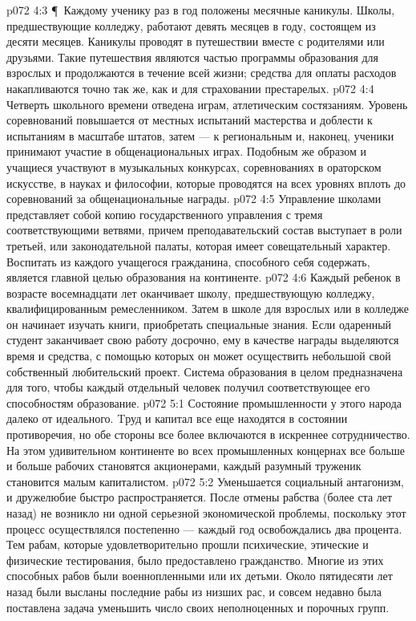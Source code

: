 \vs p072 4:3 \P\ Каждому ученику раз в год положены месячные каникулы. Школы, предшествующие колледжу, работают девять месяцев в году, состоящем из десяти месяцев. Каникулы проводят в путешествии вместе с родителями или друзьями. Такие путешествия являются частью программы образования для взрослых и продолжаются в течение всей жизни; средства для оплаты расходов накапливаются точно так же, как и для страховании престарелых.
\vs p072 4:4 Четверть школьного времени отведена играм, атлетическим состязаниям. Уровень соревнований повышается от местных испытаний мастерства и доблести к испытаниям в масштабе штатов, затем --- к региональным и, наконец, ученики принимают участие в общенациональных играх. Подобным же образом и учащиеся участвуют в музыкальных конкурсах, соревнованиях в ораторском искусстве, в науках и философии, которые проводятся на всех уровнях вплоть до соревнований за общенациональные награды.
\vs p072 4:5 Управление школами представляет собой копию государственного управления с тремя соответствующими ветвями, причем преподавательский состав выступает в роли третьей, или законодательной палаты, которая имеет совещательный характер. Воспитать из каждого учащегося гражданина, способного себя содержать, является главной целью образования на континенте.
\vs p072 4:6 Каждый ребенок в возрасте восемнадцати лет оканчивает школу, предшествующую колледжу, квалифицированным ремесленником. Затем в школе для взрослых или в колледже он начинает изучать книги, приобретать специальные знания. Если одаренный студент заканчивает свою работу досрочно, ему в качестве награды выделяются время и средства, с помощью которых он может осуществить небольшой свой собственный любительский проект. Система образования в целом предназначена для того, чтобы каждый отдельный человек получил соответствующее его способностям образование.
\vs p072 5:1 Состояние промышленности у этого народа далеко от идеального. Tруд и капитал все еще находятся в состоянии противоречия, но обе стороны все более включаются в искреннее сотрудничество. На этом удивительном континенте во всех промышленных концернах все больше и больше рабочих становятся акционерами, каждый разумный труженик становится малым капиталистом.
\vs p072 5:2 Уменьшается социальный антагонизм, и дружелюбие быстро распространяется. После отмены рабства (более ста лет назад) не возникло ни одной серьезной экономической проблемы, поскольку этот процесс осуществлялся постепенно --- каждый год освобождались два процента. Тем рабам, которые удовлетворительно прошли психические, этические и физические тестирования, было предоставлено гражданство. Многие из этих способных рабов были военнопленными или их детьми. Около пятидесяти лет назад были высланы последние рабы из низших рас, и совсем недавно была поставлена задача уменьшить число своих неполноценных и порочных групп.
